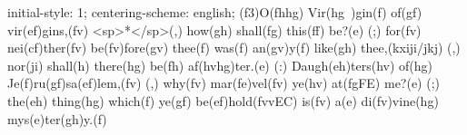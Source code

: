 initial-style: 1;
centering-scheme: english;
(f3)O(fhhg) Vir(hg~)gin(f) of(gf) vir(ef)gins,(fv) <sp>*</sp>(,) how(gh) shall(fg) this(ff) be?(e) (;) for(fv) nei(cf)ther(fv) be(fv)fore(gv) thee(f) was(f) an(gv)y(f) like(gh) thee,(kxiji/jkj) (,) nor(ji) shall(h) there(hg) be(fh) af(hvhg)ter.(e) (:) Daugh(eh)ters(hv) of(hg) Je(f)ru(gf)sa(ef)lem,(fv) (,) why(fv) mar(fe)vel(fv) ye(hv) at(fgFE) me?(e) (;) the(eh) thing(hg) which(f) ye(gf) be(ef)hold(fvvEC) is(fv) a(e) di(fv)vine(hg) mys(e)ter(gh)y.(f)
